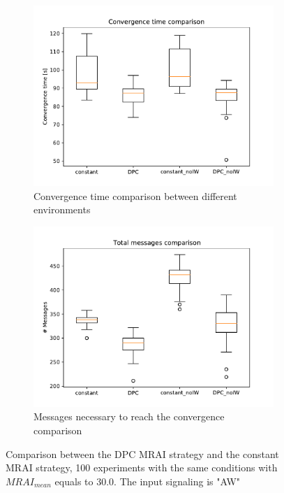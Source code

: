 \documentclass[10pt,conference,letterpaper]{IEEEtran}
\newcommand{\figwidth}{0.78}
\newcommand{\figvspace}{-1.5em}
\begin{document}
\begin{figure}[tb]
	\centering

	\begin{subfigure}{\columnwidth}
		\centering
		\includegraphics[width=\figwidth\columnwidth]{images/internet_like/S_AW/constant-dpc-100-comparison-30fixed_time_boxplot.pdf}
		\caption{Convergence time comparison between different environments}
		\label{fig:s_aw_dpc_vs_constant_convergence_time}
		\qquad
	\end{subfigure}

	\begin{subfigure}{\columnwidth}
		\centering
		\includegraphics[width=\figwidth\columnwidth]{images/internet_like/S_AW/constant-dpc-100-comparison-30fixed_messages_boxplot.pdf}
		\caption{Messages necessary to reach the convergence comparison}
		\label{fig:s_aw_dpc_vs_constant_messages}
		\qquad
	\end{subfigure}

	\caption{Comparison between the \ac{DPC} \ac{MRAI} strategy and the constant \ac{MRAI}
			 strategy, 100 experiments with the same conditions with $MRAI_{mean}$
			 equals to \num{30.0}. The input signaling is "AW"}
	\label{fig:s_aw_dpc_vs_constant}
	\vspace{\figvspace}
\end{figure}
\end{document}
